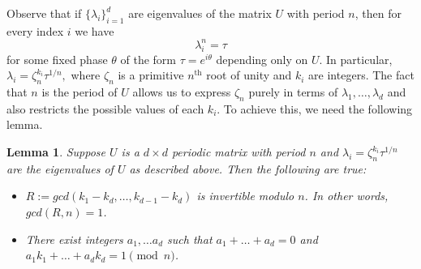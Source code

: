 \documentclass[a4paper,onecolumn,accepted=2026-04-08,10pt]{quantumarticle}
\newtheorem{lemma}[theorem]{Lemma}
\theoremstyle{definition}
\begin{document}
Observe that if $\{\lambda_{i}\}_{i=1}^{d}$ are eigenvalues of the matrix $U$ with period $n$, then for every index $i$ we have 
\begin{equation*}
    \lambda_{i}^{n} = \tau    
\end{equation*}
for some fixed phase $\theta$ of the form $\tau = e^{i\theta}$ depending only on $U$. In particular, $\lambda_{i} = \zeta_{n}^{k_i} \tau^{1/n},$ where $\zeta_n$ is a primitive $n^{\text{th}}$ root of unity and $k_{i}$ are integers. The fact that $n$ is the period of $U$ allows us to express $\zeta_n$ purely in terms of $\lambda_1, \ldots, \lambda_d$ and also restricts the possible values of each $k_i$. To achieve this, we need the following lemma.
\begin{lemma} \label{lemma:lemma 1}
    Suppose $U$ is a $d\times d$ periodic matrix with period $n$ and $\lambda_{i} = \zeta_{n}^{k_i} \tau^{1/n}$ are the eigenvalues of $U$ as described above. Then the following are true: 
    \begin{itemize}
        \item[(a)] $R := gcd(k_1 - k_d, \ldots, k_{d-1} - k_d)$ is invertible modulo $n$. In other words, $gcd(R,n) = 1$.
        \item[(b)] There exist integers $a_1, \ldots a_d$ such that $a_1 + \ldots + a_d = 0$ and $a_1 k_1 + \ldots + a_d k_d = 1 \pmod{n}$. 
    \end{itemize}
\end{lemma}
\end{document}
